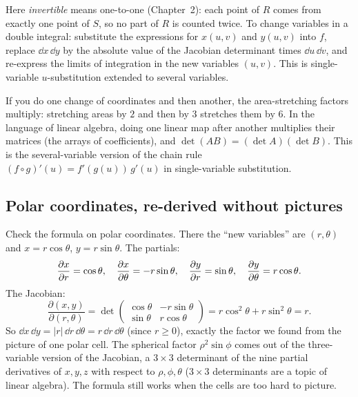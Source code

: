 Here \emph{invertible} means one-to-one (Chapter~2): each point of $R$ comes from
exactly one point of $S$, so no part of $R$ is counted twice.
To change variables in a double integral: substitute the expressions for $x(u,v)$
and $y(u,v)$ into $f$, replace $\dd x\,\dd y$ by the absolute value of the
Jacobian determinant times $\dd u\,\dd v$, and re-express the limits of
integration in the new variables $(u,v)$. This is single-variable
$u$-substitution extended to several variables.

\begin{connectionbox}
If you do one change of coordinates and then another, the area-stretching
factors multiply: stretching areas by $2$ and then by $3$ stretches them by $6$.
In the language of linear algebra, doing one linear map after another multiplies
their matrices (the arrays of coefficients), and $\det(AB) = (\det A)(\det B)$.
This is the several-variable version of the chain rule $(f\circ g)'(u) =
f'(g(u))\,g'(u)$ in single-variable substitution.
\end{connectionbox}

\subsection{Polar coordinates, re-derived without pictures}

Check the formula on polar coordinates. There the ``new variables'' are
$(r,\theta)$ and
$x=r\cos\theta$, $y=r\sin\theta$. The partials:
\[
  \frac{\partial x}{\partial r}=\cos\theta,\quad \frac{\partial x}{\partial \theta}=-r\sin\theta,\quad
  \frac{\partial y}{\partial r}=\sin\theta,\quad \frac{\partial y}{\partial \theta}=r\cos\theta .
\]
The Jacobian:
\[
  \frac{\partial(x,y)}{\partial(r,\theta)}
  =\det\!\begin{pmatrix}\cos\theta & -r\sin\theta\\ \sin\theta & r\cos\theta\end{pmatrix}
  =r\cos^2\theta+r\sin^2\theta=r .
\]
So $\dd x\,\dd y=|r|\,\dd r\,\dd\theta=r\,\dd r\,\dd\theta$ (since $r\ge0$),
exactly the factor we found from the picture of one polar cell. The spherical
factor $\rho^2\sin\phi$ comes out of the three-variable version of the Jacobian,
a $3\times 3$ determinant of the nine partial derivatives of $x,y,z$ with
respect to $\rho,\phi,\theta$ ($3\times 3$ determinants are a topic of linear
algebra). The formula still works when the cells are too hard to picture.

